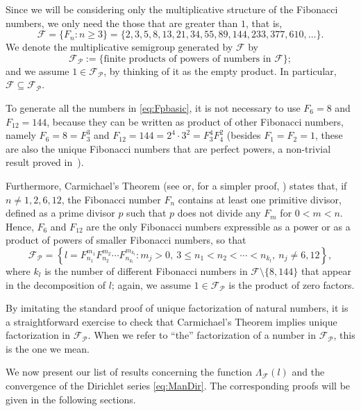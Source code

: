 \documentclass[11pt, a4paper]{article}
\newcommand{\calF}{\mathcal{F}}
\newcommand{\p}{\mathcal{P}} %
\newcommand{\manF}{\Lambda_{\mathcal{F}}}
\newcommand{\Fp}{\mathcal{F}_{\mathcal{P}}}
\theoremstyle{plain}
\theoremstyle{definition}
\begin{document}
Since we will be considering only the multiplicative structure of the Fibonacci numbers, we only need the those that are greater than $1$, that is,
\[
\calF = \{ F_{n} : n\ge3 \} = \{ 2, 3, 5, 8, 13, 21, 34, 55, 89, 144, 233, 377, 610,\dots \}.
\]
We denote the multiplicative semigroup generated by $\calF$ by
\begin{equation}
\label{eq:Fpbasic}
\Fp := \{\text{finite products of powers of numbers in $\calF$}\};
\end{equation}
and we assume $1 \in \Fp$, by thinking of it as the empty product. In particular, $\calF \subseteq \Fp$.

To generate all the numbers in \eqref{eq:Fpbasic}, it is not necessary to use $F_6=8$ and $F_{12}=144$, because they can be written as product of other Fibonacci numbers, namely $F_6 = 8 = F_3^3$ and $F_{12} = 144 = 2^4 \cdot 3^2 = F_3^4 F_4^2$ (besides $F_1=F_2=1$, these are also the unique Fibonacci numbers that are perfect powers, a non-trivial result proved in~\cite{BMS}). 

Furthermore, Carmichael's Theorem (see \cite[Theorem~23, p.~61]{Car} or, for a simpler proof, \cite[Theorem 3]{Ya}) states that, if $n \ne 1,2,6,12$, the Fibonacci number $F_{n}$ contains at least one primitive divisor, defined as a prime divisor $p$ such that $p$ does not divide any $F_m$ for $0<m<n$. Hence, $F_{6}$ and $F_{12}$ are the only Fibonacci numbers expressible as a power or as a product of powers of smaller Fibonacci numbers, so that
\begin{equation}
\label{eq:Fp}
\Fp = \left\{
l = F_{n_1}^{m_1}F_{n_2}^{m_2} \cdots F_{n_{k_l}}^{m_{k_l}} :
m_{j}>0, \ 3 \le n_1<n_2<\cdots<n_{k_l}, \ n_{j}\neq 6, 12 \right\}, 
\end{equation}
where $k_{l}$ is the number of different Fibonacci numbers in $\calF \setminus \{8,144\}$ that appear in the decomposition of $l$; again, we assume $1 \in \Fp$ is the product of zero factors. 

By imitating the standard proof of unique factorization of natural numbers, it is a straightforward exercise to check that Carmichael's Theorem implies unique factorization in $\Fp$. When we refer to ``the'' factorization of a number in $\Fp$, this is the one we mean.

We now present our list of results concerning the function $\manF(l)$ and the convergence of the Dirichlet series \eqref{eq:ManDir}. The corresponding proofs will be given in the following sections.
\end{document}
